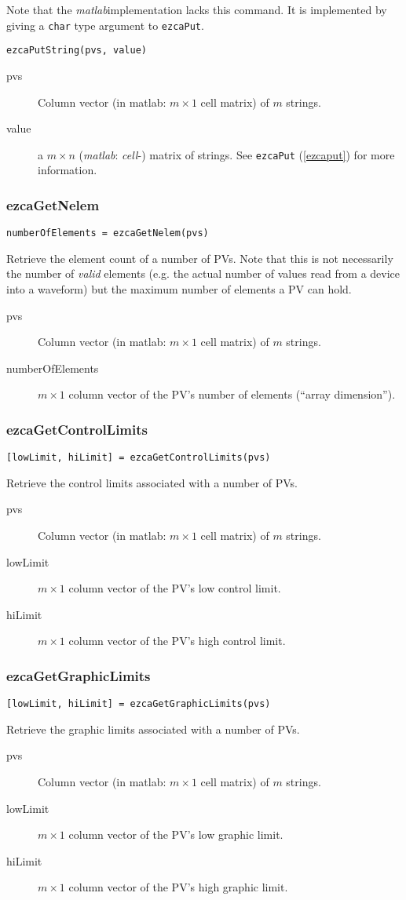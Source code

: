 \documentclass{article}
\newcommand{\matlab}{{\em matlab}}
\newcommand{\com}[1]{{\tt #1}}
\newcommand{\PVITEM}{
\item[pvs] Column vector (in matlab: $m\times 1$ cell matrix)
of $m$ strings.
}
\begin{document}
Note that the \matlab implementation lacks this command. It is implemented
by giving a \com{char}{} type argument to \com{ezcaPut}.
\begin{verbatim}
ezcaPutString(pvs, value)
\end{verbatim}
\begin{description}
\PVITEM
%
%
\item[value] a $m\times n$ (\matlab: {\em cell}-) matrix of strings. See \com{ezcaPut}{}
(\ref{ezcaput}) for more information.
\end{description}



\subsubsection{ezcaGetNelem}
\begin{verbatim}
numberOfElements = ezcaGetNelem(pvs)
\end{verbatim}
Retrieve the element count of a number of PVs. Note that this is not
necessarily the number of {\em valid} elements (e.g. the actual number
of values read from a device into a waveform) but the maximum number
of elements a PV can hold.
\begin{description}
\PVITEM
\item[numberOfElements] $m\times 1$ column vector of the PV's number
of elements (``array dimension'').
\end{description}

\subsubsection{ezcaGetControlLimits}
\begin{verbatim}
[lowLimit, hiLimit] = ezcaGetControlLimits(pvs)
\end{verbatim}
Retrieve the control limits associated with a number of PVs.
\begin{description}
\PVITEM
\item[lowLimit] $m\times 1$ column vector of the PV's low control limit.
\item[hiLimit]  $m\times 1$ column vector of the PV's high control limit.
\end{description}


\subsubsection{ezcaGetGraphicLimits}
\begin{verbatim}
[lowLimit, hiLimit] = ezcaGetGraphicLimits(pvs)
\end{verbatim}
Retrieve the graphic limits associated with a number of PVs.
\begin{description}
\PVITEM
\item[lowLimit] $m\times 1$ column vector of the PV's low graphic limit.
\item[hiLimit]  $m\times 1$ column vector of the PV's high graphic limit.
\end{description}
\end{document}
